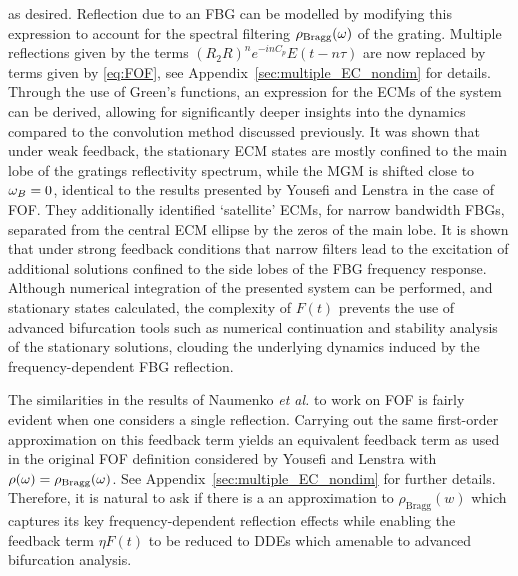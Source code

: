 %
as desired. 
Reflection due to an FBG can be modelled by modifying this expression to account for the spectral filtering $\rho_{\text{Bragg}}(\omega)$ of the grating. 
Multiple reflections given by the terms $(R_2 R)^n e^{-i n C_p} E(t-n \tau)$ are now replaced by terms given by \eqref{eq:FOF}, see Appendix~\ref{sec:multiple_EC_nondim} for details. 
Through the use of Green's functions, an expression for the ECMs of the system can be derived, allowing for significantly deeper insights into the dynamics compared to the convolution method discussed previously. 
It was shown that under weak feedback, the stationary ECM states are mostly confined to the main lobe of the gratings reflectivity spectrum, while the MGM is shifted close to $\omega_B=0$, 
identical to the results presented by Yousefi and Lenstra in the case of FOF. 
They additionally identified `satellite' ECMs, for narrow bandwidth FBGs, separated from the central ECM ellipse by the zeros of the main lobe. 
It is shown that under strong feedback conditions that narrow filters lead to the excitation of additional solutions confined to the side lobes of the FBG frequency response. 
Although numerical integration of the presented system can be performed, and stationary states calculated, 
the complexity of $F(t)$ prevents the use of advanced bifurcation tools such as numerical continuation and stability analysis of the stationary solutions, clouding the underlying dynamics induced by the frequency-dependent FBG reflection. 
%
\par
%
The similarities in the results of Naumenko \textit{et al.} to work on FOF is fairly evident when one considers a single reflection. 
Carrying out the same first-order approximation on this feedback term yields an equivalent feedback term as used in the original FOF definition considered by Yousefi and Lenstra with $\rho(\omega) = \rho_\text{Bragg}(\omega)$. 
See Appendix~\ref{sec:multiple_EC_nondim} for further details. 
Therefore, it is natural to ask if there is a an approximation to $\rho_\text{Bragg}(w)$ which captures its key frequency-dependent reflection effects while enabling the feedback term $\eta F(t)$ to be reduced to DDEs which amenable to advanced bifurcation analysis.